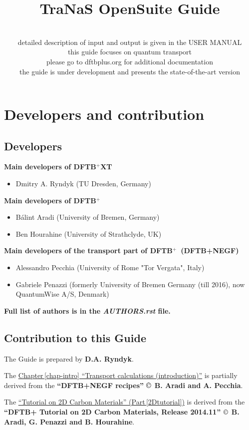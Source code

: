 \documentclass[a4paper,11pt,english]{sphinxmanual}
\title{TraNaS OpenSuite Guide}
\author{}
\date{\normalfont\sffamily {tranas.org/opensuite}\\[0.2cm]
  detailed description of input and output is given in the \dftbpxt USER MANUAL \\[0.2cm]
  this guide focuses on quantum transport \\
  please go to {dftbplus.org} for additional \dftbp documentation  \\[0.2cm]
  the guide is under development and presents the state-of-the-art version}
\newcommand{\dftbp}{\textsf{DFTB$^{\text{+}}$\ }} %
\newcommand{\dftbpxt}{\textsf{DFTB$^{\text{+}}$XT\ }} %
\begin{document}
\maketitle

\chapter*{\Large\bf\sffamily Developers and contribution}

\section*{Developers}

{\bf Main developers of \dftbpxt}
\begin{itemize}
\item Dmitry A. Ryndyk (TU Dresden, Germany)
\end{itemize}
  
{\bf Main developers of \dftbp}
\begin{itemize}
\item Bálint Aradi (University of Bremen, Germany)
\item Ben Hourahine (University of Strathclyde, UK)
\end{itemize}
  
{\bf Main developers of the transport part of \dftbp (DFTB+NEGF)}
\begin{itemize}
\item Alessandro Pecchia (University of Rome "Tor Vergata", Italy)
\item Gabriele Penazzi (formerly University of Bremen Germany (till 2016), now QuantumWise A/S, Denmark)
\end{itemize}

{\bf Full list of authors is in the \emph{AUTHORS.rst} file.}

\section*{Contribution to this Guide}

The Guide is prepared by {\bf D.A. Ryndyk}.

The {\hyperref[chap-intro]{Chapter\,\ref{chap-intro} ``Transport calculations (introduction)''}} is partially derived from the {\bf ``DFTB+NEGF recipes'' $\copyright$ B. Aradi and A. Pecchia}.   

The {\hyperref[2Dtutorial]{``Tutorial on 2D Carbon Materials'' (Part\,\ref{2Dtutorial})}} is derived from the {\bf ``DFTB+ Tutorial on 2D Carbon Materials, Release 2014.11'' $\copyright$ B. Aradi, G. Penazzi and B. Hourahine}.    
    
\end{document}
